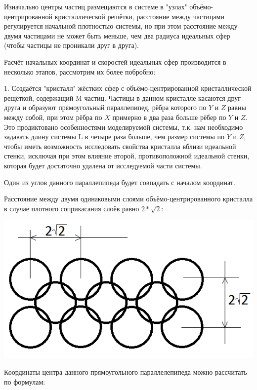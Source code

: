 \documentclass{article}
\begin{document}
Изначально центры частиц размещаются в системе в "узлах" объёмо-центрированной кристаллической решётки, расстояние между частицами регулируется начальной плотностью системы, но при этом расстояние между двумя частицами не может быть меньше, чем два радиуса идеальных сфер (чтобы частицы не проникали друг в друга).

Расчёт начальных координат и скоростей идеальных сфер производится в несколько этапов, рассмотрим их более побробно:

1. Создаётся "кристалл" жёстких сфер с объёмо-центрированной кристаллической рещёткой, содержащий M частиц. Частицы в данном кристалле касаются друг друга и образуют прямоугольный параллепипед, рёбра которого по $ Y $ и $ Z $ равны между собой, при этом рёбра по $ X $ примерно в два раза больше рёбер по $ Y $ и $ Z $. Это продиктовано особенностями моделируемой системы, т.к. нам необходимо задавать длину системы L в четыре раза больше, чем размер системы по $ Y $ и $ Z $, чтобы иметь возможность исследовать свойства кристалла вблизи идеальной стенки, исключая при этом влияние второй, противоположной идеальной стенки, которая будет достаточно удалена от исследуемой части системы.

Один из углов данного параллепипеда будет совпадать с началом координат.

Расстояние между двумя одинаковыми слоями объёмо-центрированного кристалла в случае плотного соприкасания слоёв равно $ 2*\sqrt{2} $:

\begin{center}
\includegraphics[scale=0.5]{distance_between_particles.png}
\end{center}

Координаты центра данного прямоугольного параллелепипеда можно рассчитать по формулам:
\end{document}
